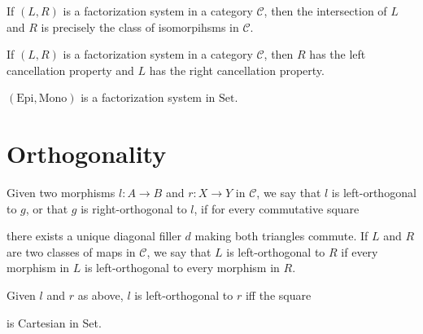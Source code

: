 \begin{lemma}
  If $(L,R)$ is a factorization system in a category $\mathcal{C}$, then the intersection of $L$ and $R$ is precisely the class of isomorpihsms in $\mathcal{C}$.
\end{lemma}

\begin{lemma}
  If $(L,R)$ is a factorization system in a category $\mathcal{C}$, then $R$ has the left cancellation property and $L$ has the right cancellation property.
\end{lemma}

\begin{lemma}
  $(\text{Epi},\text{Mono})$ is a factorization system in $\text{Set}$.
\end{lemma}

\section{Orthogonality}

\begin{definition}
  Given two morphisms $l : A \to B$ and $r : X \to Y$ in $\mathcal{C}$, we say that $l$ is left-orthogonal to $g$, or that $g$ is right-orthogonal to $l$, if for every commutative square
  \begin{center}
  \end{center}
  there exists a unique diagonal filler $d$ making both triangles commute. If $L$ and $R$ are two classes of maps in $\mathcal{C}$, we say that $L$ is left-orthogonal to $R$ if every morphism in $L$ is left-orthogonal to every morphism in $R$.
\end{definition}

\begin{lemma}
  Given $l$ and $r$ as above, $l$ is left-orthogonal to $r$ iff the square
  \begin{center}
  \end{center}
  is Cartesian in Set. 
\end{lemma}

